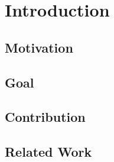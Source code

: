 \chapter{Introduction}
\label{ch:Introduction}


\section{Motivation}
\label{sec:Motivation}

\section{Goal}
\label{sec:Goal}

\section{Contribution}
\label{sec:Contribution}

\section{Related Work}
\label{sec:RelatedWork}
